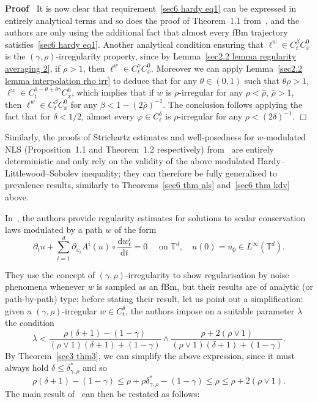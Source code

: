 \documentclass[10pt]{article}
\newcommand{\mathd}{\mathrm{d}}
\newenvironment{proof}{\noindent\textbf{Proof\ }}{\hspace*{\fill}$\Box$\medskip}
\begin{document}
\begin{proof}
  It is now clear that requirement~{\eqref{sec6 hardy eq1}} can be expressed
  in entirely analytical terms and so does the proof of Theorem~1.1
  from~{\cite{duboscq}}, and the authors are only using the additional fact
  that almost every fBm trajectory satisfies~{\eqref{sec6 hardy eq1}}. Another
  analytical condition ensuring that $\ell^w \in C^{\beta}_t C^0_x$ is the
  $(\gamma, \rho)$\mbox{-}irregularity property, since by Lemma~\ref{sec2.2
  lemma regularity averaging 2}, if $\rho > 1$, then $\ell^w \in C^{\gamma}_t
  C^0_x$. Moreover we can apply Lemma~\ref{sec2.2 lemma interpolation rho irr}
  to deduce that for any $\theta \in (0, 1)$ such that $\theta \rho > 1$,
  $\ell^w \in C^{1 - \theta + \theta \gamma}_t C^0_x$, which implies that if
  $w$ is $\rho$\mbox{-}irregular for any $\rho < \bar{\rho}$, $\bar{\rho} >
  1$, then $\ell^w \in C^{\beta}_t C^0_x$ for any $\beta < 1 - (2
  \bar{\rho})^{- 1}$. The conclusion follows applying the fact that for
  $\delta < 1 / 2$, almost every $\varphi \in C^{\delta}_t$ is
  $\rho$\mbox{-}irregular for any $\rho < (2 \delta)^{- 1}$.
\end{proof}

Similarly, the proofs of Strichartz estimates and well-posedness for
$w$\mbox{-}modulated NLS (Proposition~1.1 and Theorem~1.2 respectively)
from~{\cite{duboscq}} are entirely deterministic and only rely on the validity
of the above modulated Hardy--Littlewood--Sobolev inequality; they can
therefore be fully generalised to prevalence results, similarly to
Theorems~\ref{sec6 thm nls} and~\ref{sec6 thm kdv} above.



In~{\cite{choukgess}}, the authors provide regularity estimates for solutions
to scalar conservation laws modulated by a path $w$ of the form
\begin{equation}
  \partial_t u + \sum_{i = 1}^d \partial_{x_i} A^i (u) \circ \frac{\mathd
  w^i_t}{\mathd t} = 0 \quad \text{ on } \mathbb{T}^d, \quad u (0) = u_0 \in
  L^{\infty} (\mathbb{T}^d) . \label{sec6 gess eq1}
\end{equation}


They use the concept of $(\gamma, \rho)$\mbox{-}irregularity to show
regularisation by noise phenomena whenever $w$ is sampled as an fBm, but their
results are of analytic (or path\mbox{-}by\mbox{-}path) type; before stating
their result, let us point out a simplification: given a $(\gamma,
\rho)$\mbox{-}irregular $w \in C^{\delta}_t$, the authors impose on a suitable
parameter $\lambda$ the condition
\[ \lambda < \frac{\rho (\delta + 1) - (1 - \gamma)}{(\rho \vee 1) (\delta +
   1) + (1 - \gamma)} \wedge \frac{\rho + 2 (\rho \vee 1)}{(\rho \vee 1)
   (\delta + 1) + (1 - \gamma)} . \]
By Theorem~\ref{sec3 thm3}, we can simplify the above expression, since it
must always hold $\delta \leqslant \delta^{\ast}_{\gamma, \rho}$ and so
\[ \rho (\delta + 1) - (1 - \gamma) \leqslant \rho + \rho
   \delta^{\ast}_{\gamma, \rho} - (1 - \gamma) \leqslant \rho \leqslant \rho +
   2 (\rho \vee 1) . \]
The main result of~{\cite{choukgess}} can then be restated as follows:
\end{document}
